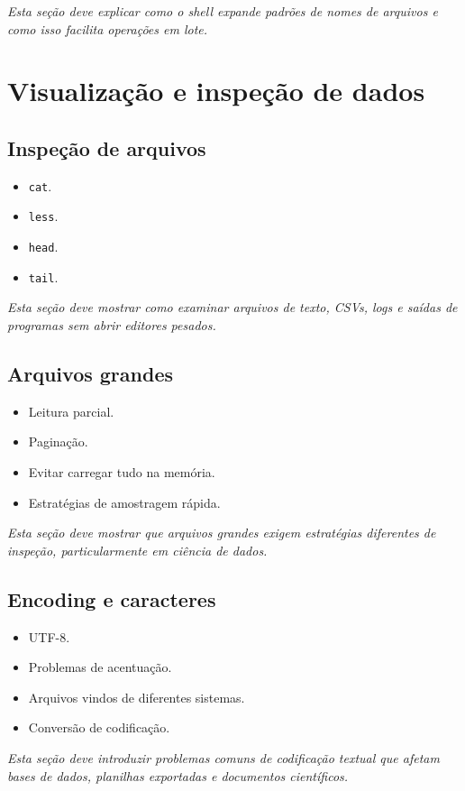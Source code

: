 \documentclass[12pt,openany]{book}
\newcommand{\placeholder}[1]{
    \par\medskip
    \noindent\textit{#1}
    \par\medskip
}
\newcommand{\topicos}[1]{
    \begin{itemize}
        #1
    \end{itemize}
}
\begin{document}
\begin{refsection}
\placeholder{Esta seção deve explicar como o shell expande padrões de nomes de arquivos e como isso facilita operações em lote.}

\chapter{Visualização e inspeção de dados}

\section{Inspeção de arquivos}

\topicos{
    \item \texttt{cat}.
    \item \texttt{less}.
    \item \texttt{head}.
    \item \texttt{tail}.
}

\placeholder{Esta seção deve mostrar como examinar arquivos de texto, CSVs, logs e saídas de programas sem abrir editores pesados.}

\section{Arquivos grandes}

\topicos{
    \item Leitura parcial.
    \item Paginação.
    \item Evitar carregar tudo na memória.
    \item Estratégias de amostragem rápida.
}

\placeholder{Esta seção deve mostrar que arquivos grandes exigem estratégias diferentes de inspeção, particularmente em ciência de dados.}

\section{Encoding e caracteres}

\topicos{
    \item UTF-8.
    \item Problemas de acentuação.
    \item Arquivos vindos de diferentes sistemas.
    \item Conversão de codificação.
}

\placeholder{Esta seção deve introduzir problemas comuns de codificação textual que afetam bases de dados, planilhas exportadas e documentos científicos.}


\end{refsection}
\end{document}
